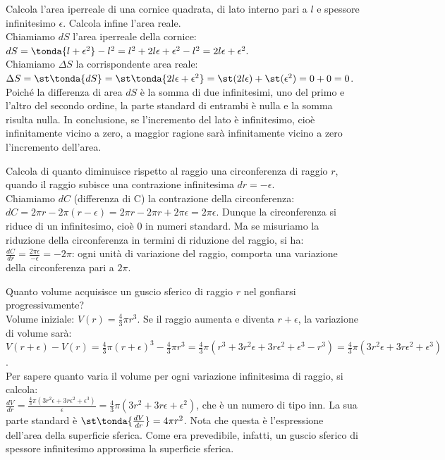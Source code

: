 \begin{esempio}
Calcola l'area iperreale di una cornice quadrata, di lato interno pari a 
$l$ e
spessore infinitesimo $\epsilon$. Calcola infine l'area reale.\\
Chiamiamo $dS$ l'area iperreale della cornice:
\(dS=\tonda{l+\epsilon^2}
-l^2=l^2+2l\epsilon+\epsilon^2-l^2=2l\epsilon+\epsilon^2.\)\\
Chiamiamo $\Delta S$ la corrispondente area reale:
\(\Delta S=\st\tonda{dS}=\st\tonda{2l\epsilon+\epsilon^2}=
\st(2l\epsilon)+\st(\epsilon^2)=0+0=0\).\\
Poiché la differenza di area $dS$ è la somma di due infinitesimi, uno del 
primo e 
l'altro del secondo ordine, la parte standard di entrambi è nulla e la 
somma 
risulta nulla. In conclusione, se l'incremento del lato è infinitesimo,
cioè infinitamente vicino a zero, a maggior ragione sarà infinitamente 
vicino
a zero l'incremento dell'area.
\end{esempio}

\begin{esempio}
Calcola di quanto diminuisce rispetto al raggio una circonferenza di raggio 
$r$,
quando il raggio subisce una contrazione infinitesima $dr=-\epsilon$.\\
Chiamiamo $dC$ (differenza di C) la contrazione della circonferenza:
\(dC=2\pi r-2\pi (r-\epsilon)=2\pi r-2\pi r+2\pi \epsilon= 2\pi \epsilon\).
Dunque la circonferenza si riduce di un infinitesimo, cioè $0$ in numeri 
standard.
Ma se misuriamo la riduzione della circonferenza in termini
di riduzione del raggio, si ha:
\(\frac{dC}{dr}=\frac{2\pi \epsilon}{-\epsilon}=-2\pi\): ogni unità di 
variazione 
del raggio, comporta una variazione della circonferenza pari a $2\pi$.
\end{esempio}

\begin{esempio}
Quanto volume acquisisce un guscio sferico di raggio $r$ nel gonfiarsi
progressivamente?\\
Volume iniziale: $V(r)=\frac{4}{3}\pi r^3$. Se il raggio aumenta e diventa 
$r+\epsilon$, 
la variazione di volume sarà:\\
\(V(r+\epsilon)-V(r)=\frac{4}{3}\pi (r+\epsilon)^3-\frac{4}{3}\pi r^3=
\frac{4}{3}\pi (r^3+3r^2\epsilon+3r\epsilon^2+\epsilon^3-r^3)=
\frac{4}{3}\pi (3r^2\epsilon+3r\epsilon^2+\epsilon^3)\).\\
Per sapere quanto varia il volume per ogni variazione infinitesima di 
raggio, si calcola:\\
\(\frac{dV}{dr}=\frac{\frac{4}{3}\pi 
(3r^2\epsilon+3r\epsilon^2+\epsilon^3)}{\epsilon}=
\frac{4}{3}\pi (3r^2+3r\epsilon+\epsilon^2)\), che è un numero di tipo inn.
La sua parte standard è $\st\tonda{\frac{dV}{dr}}=4\pi r^2$. Nota che questa
è l'espressione dell'area della superficie sferica. Come era prevedibile, 
infatti, 
un guscio sferico di spessore infinitesimo approssima la superficie sferica.
\end{esempio}

